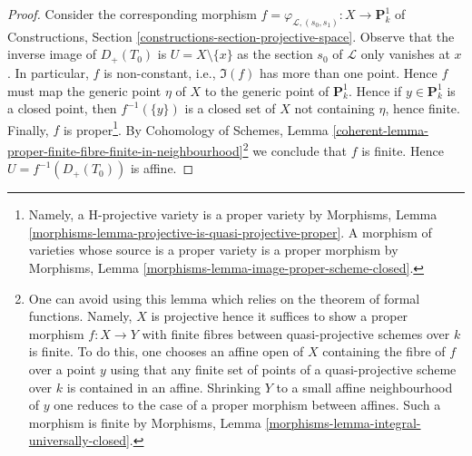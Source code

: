 \begin{proof}
\medskip\noindent
Consider the corresponding morphism
$f = \varphi_{\mathcal{L}, (s_0, s_1)} : X \to \mathbf{P}^1_k$
of Constructions, Section \ref{constructions-section-projective-space}.
Observe that the inverse image of $D_{+}(T_0)$ is $U = X \setminus \{x\}$
as the section $s_0$ of $\mathcal{L}$ only vanishes at $x$.
In particular, $f$ is non-constant, i.e., $\Im(f)$ has more
than one point. Hence $f$ must map the generic
point $\eta$ of $X$ to the generic point of $\mathbf{P}^1_k$.
Hence if $y \in \mathbf{P}^1_k$ is a closed point, then $f^{-1}(\{y\})$
is a closed set of $X$ not containing $\eta$, hence finite.
Finally, $f$ is proper\footnote{Namely, a H-projective variety
is a proper variety by Morphisms, Lemma
\ref{morphisms-lemma-projective-is-quasi-projective-proper}.
A morphism of varieties whose source is a proper variety is a proper morphism
by Morphisms, Lemma \ref{morphisms-lemma-image-proper-scheme-closed}.}.
By Cohomology of Schemes, Lemma
\ref{coherent-lemma-proper-finite-fibre-finite-in-neighbourhood}\footnote{One
can avoid using this lemma which relies on the theorem of formal
functions. Namely, $X$ is projective hence it suffices to show
a proper morphism $f : X \to Y$ with finite fibres between quasi-projective
schemes over $k$ is finite. To do this, one chooses an affine open of $X$
containing the fibre of $f$ over a point $y$ using that any finite set of
points of a quasi-projective scheme over $k$ is contained in an affine.
Shrinking $Y$ to a small affine neighbourhood of $y$ one reduces to the
case of a proper morphism between affines. Such a morphism is finite by
Morphisms, Lemma \ref{morphisms-lemma-integral-universally-closed}.}
we conclude that $f$ is finite. Hence $U = f^{-1}(D_{+}(T_0))$
is affine.
\end{proof}